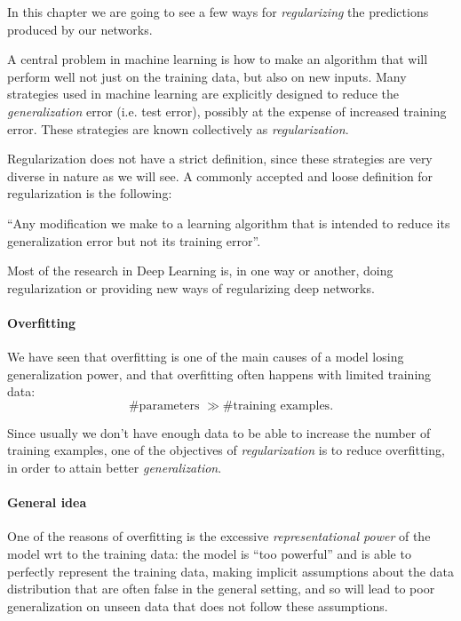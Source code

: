 
In this chapter we are going to see a few ways for \emph{regularizing}
the predictions produced by our networks. 

A central problem in machine learning is how to make an algorithm that will perform well not just on the training data, but also on new inputs. Many strategies used in machine learning are explicitly designed to reduce the \emph{generalization} error (i.e. test error), possibly at the expense of increased training error. These strategies are known collectively as \emph{regularization}.

Regularization does not have a strict definition, since these strategies are very diverse in nature as we will see. A commonly accepted and loose definition for regularization is the following:
\begin{center}
    ``Any modification we make to a learning algorithm that is intended to reduce its generalization error but not its training error''.
\end{center}

Most of the research in Deep Learning is, in one way or another, doing regularization or providing new ways of regularizing deep networks.

\paragraph{Overfitting}

We have seen that overfitting is one of the main causes of a model losing generalization power, and that overfitting often happens with limited training data:
\begin{equation}
    \# \text{parameters } \gg \# \text{training examples}.
\end{equation}

Since usually we don't have enough data to be able to increase the number of training examples, one of the objectives of \emph{regularization} is to reduce overfitting, in order to attain better \emph{generalization}.

\paragraph{General idea}

One of the reasons of overfitting is the excessive \emph{representational power} of the model wrt to the training data: the model is ``too powerful'' and is able to perfectly represent the training data, making implicit assumptions about the data distribution that are often false in the general setting, and so will lead to poor generalization on unseen data that does not follow these assumptions. 

